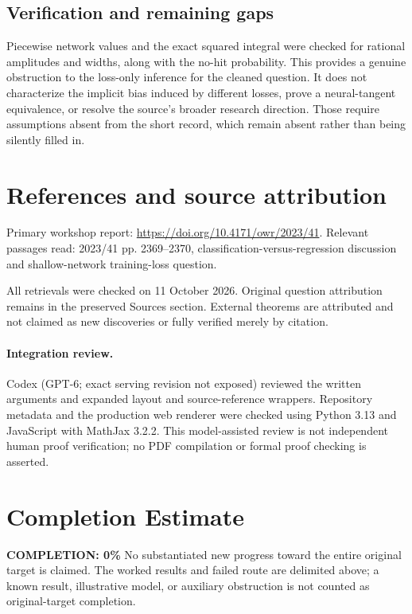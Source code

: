 \documentclass[11pt]{article}
\begin{document}
\subsection{Verification and remaining gaps}
Piecewise network values and the exact squared integral were checked for rational amplitudes and widths, along with the no-hit probability. This provides a genuine obstruction to the loss-only inference for the cleaned question. It does not characterize the implicit bias induced by different losses, prove a neural-tangent equivalence, or resolve the source's broader research direction. Those require assumptions absent from the short record, which remain absent rather than being silently filled in.

\section{References and source attribution}
Primary workshop report: \url{https://doi.org/10.4171/owr/2023/41}. Relevant passages read: 2023/41 pp. 2369--2370, classification-versus-regression discussion and shallow-network training-loss question.

All retrievals were checked on 11 October 2026. Original question attribution remains in the preserved Sources section. External theorems are attributed and not claimed as new discoveries or fully verified merely by citation.


\paragraph{Integration review.} Codex (GPT-6; exact serving revision not exposed) reviewed the written arguments and expanded layout and source-reference wrappers. Repository metadata and the production web renderer were checked using Python 3.13 and JavaScript with MathJax 3.2.2. This model-assisted review is not independent human proof verification; no PDF compilation or formal proof checking is asserted.

\section{Completion Estimate}
\noindent\textbf{COMPLETION: 0\%}
No substantiated new progress toward the entire original target is claimed. The worked results and failed route are delimited above; a known result, illustrative model, or auxiliary obstruction is not counted as original-target completion.
\end{document}
